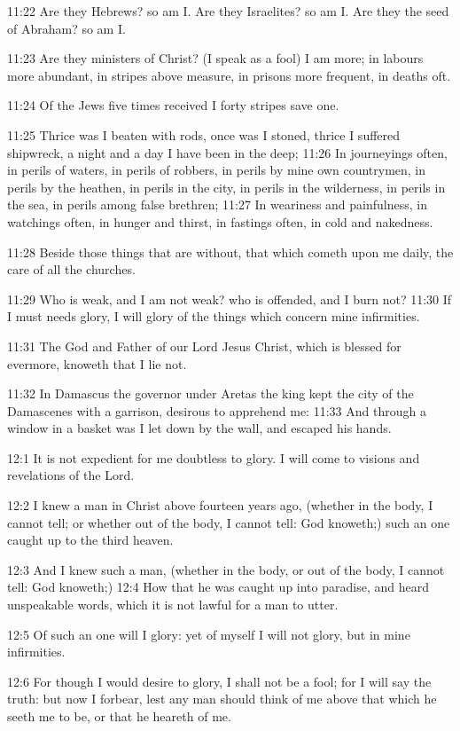 11:22 Are they Hebrews? so am I. Are they Israelites? so am I. Are they the seed of Abraham? so am I.

11:23 Are they ministers of Christ? (I speak as a fool) I am more; in labours more abundant, in stripes above measure, in prisons more frequent, in deaths oft.

11:24 Of the Jews five times received I forty stripes save one.

11:25 Thrice was I beaten with rods, once was I stoned, thrice I suffered shipwreck, a night and a day I have been in the deep; 11:26 In journeyings often, in perils of waters, in perils of robbers, in perils by mine own countrymen, in perils by the heathen, in perils in the city, in perils in the wilderness, in perils in the sea, in perils among false brethren; 11:27 In weariness and painfulness, in watchings often, in hunger and thirst, in fastings often, in cold and nakedness.

11:28 Beside those things that are without, that which cometh upon me daily, the care of all the churches.

11:29 Who is weak, and I am not weak? who is offended, and I burn not?  11:30 If I must needs glory, I will glory of the things which concern mine infirmities.

11:31 The God and Father of our Lord Jesus Christ, which is blessed for evermore, knoweth that I lie not.

11:32 In Damascus the governor under Aretas the king kept the city of the Damascenes with a garrison, desirous to apprehend me: 11:33 And through a window in a basket was I let down by the wall, and escaped his hands.

12:1 It is not expedient for me doubtless to glory. I will come to visions and revelations of the Lord.

12:2 I knew a man in Christ above fourteen years ago, (whether in the body, I cannot tell; or whether out of the body, I cannot tell: God knoweth;) such an one caught up to the third heaven.

12:3 And I knew such a man, (whether in the body, or out of the body, I cannot tell: God knoweth;) 12:4 How that he was caught up into paradise, and heard unspeakable words, which it is not lawful for a man to utter.

12:5 Of such an one will I glory: yet of myself I will not glory, but in mine infirmities.

12:6 For though I would desire to glory, I shall not be a fool; for I will say the truth: but now I forbear, lest any man should think of me above that which he seeth me to be, or that he heareth of me.

